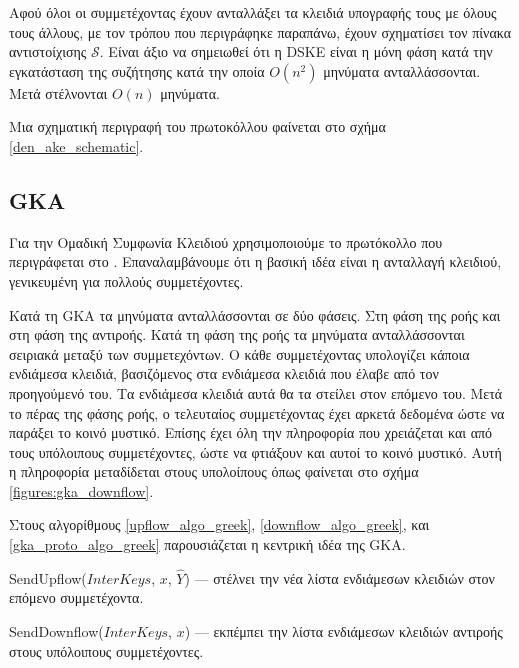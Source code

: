 Αφού όλοι οι συμμετέχοντας έχουν ανταλλάξει τα κλειδιά υπογραφής τους με όλους τους άλλους, με τον τρόπου που περιγράφηκε παραπάνω, έχουν σχηματίσει τον πίνακα αντιστοίχισης $\mathcal{S}$.
Είναι άξιο να σημειωθεί ότι η DSKE είναι η μόνη φάση κατά την εγκατάσταση της συζήτησης κατά την οποία $O(n^2)$ μηνύματα ανταλλάσσονται.
Μετά στέλνονται $O(n)$ μηνύματα.

Μια σχηματική περιγραφή του πρωτοκόλλου φαίνεται στο σχήμα \ref{den_ake_schematic}.


\subsection{GKA}
\label{gka_subprot}


Για την Ομαδική Συμφωνία Κλειδιού χρησιμοποιούμε το πρωτόκολλο που περιγράφεται στο \cite{mpenc}.
Επαναλαμβάνουμε ότι η βασική ιδέα είναι η \dhname ανταλλαγή κλειδιού, γενικευμένη για πολλούς συμμετέχοντες.

Κατά τη GKA τα μηνύματα ανταλλάσσονται σε δύο φάσεις. Στη φάση της ροής και στη φάση της αντιροής.
Κατά τη φάση της ροής τα μηνύματα ανταλλάσσονται σειριακά μεταξύ των συμμετεχόντων.
Ο κάθε συμμετέχοντας υπολογίζει κάποια ενδιάμεσα κλειδιά, βασιζόμενος στα ενδιάμεσα κλειδιά που έλαβε από τον προηγούμενό του.
Τα ενδιάμεσα κλειδιά αυτά θα τα στείλει στον επόμενο του.
Μετά το πέρας της φάσης ροής, ο τελευταίος συμμετέχοντας έχει αρκετά δεδομένα ώστε να παράξει το κοινό μυστικό.
Επίσης έχει όλη την πληροφορία που χρειάζεται και από τους υπόλοιπους συμμετέχοντες, ώστε να φτιάξουν και αυτοί το κοινό μυστικό.
Αυτή η πληροφορία μεταδίδεται στους υπολοίπους όπως φαίνεται στο σχήμα \ref{figures:gka_downflow}.

Στους αλγορίθμους \ref{upflow_algo_greek}, \ref{downflow_algo_greek}, και \ref{gka_proto_algo_greek} παρουσιάζεται η κεντρική ιδέα της GKA.

\begin{algorithm}[t]
  \caption{SendUpflow($InterKeys$, $x$, $\hat{Y}$) --- στέλνει την νέα λίστα ενδιάμεσων κλειδιών στον επόμενο συμμετέχοντα.}
  \label{upflow_algo_greek}
  
\end{algorithm}

\begin{algorithm}[t]
  \caption{SendDownflow($InterKeys$, $x$) --- εκπέμπει την λίστα ενδιάμεσων κλειδιών αντιροής στους υπόλοιπους συμμετέχοντες.}
  \label{downflow_algo_greek}
  
\end{algorithm}

